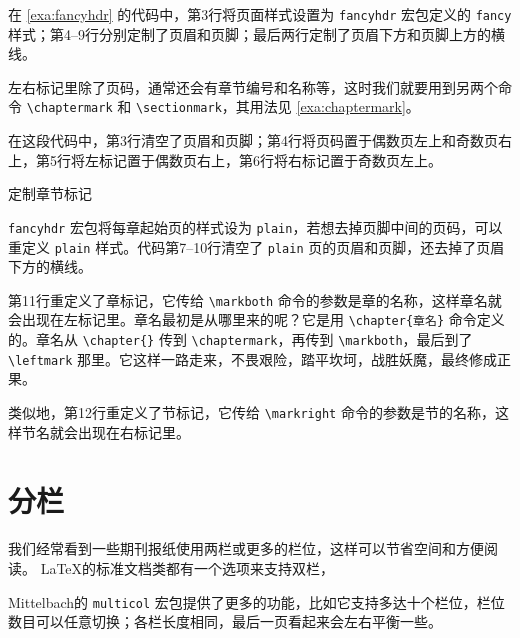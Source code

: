 在 \autoref{exa:fancyhdr} 的代码中，第3行将页面样式设置为 \texttt{fancyhdr} 宏包定义的 \texttt{fancy} 样式；第4--9行分别定制了页眉和页脚；最后两行定制了页眉下方和页脚上方的横线。

左右标记里除了页码，通常还会有章节编号和名称等，这时我们就要用到另两个命令 \verb|\chaptermark| 和 \verb|\sectionmark|，其用法见 \autoref{exa:chaptermark}。

在这段代码中，第3行清空了页眉和页脚；第4行将页码置于偶数页左上和奇数页右上，第5行将左标记置于偶数页右上，第6行将右标记置于奇数页左上。

\begin{example}[htbp]
\caption{定制章节标记}
\label{exa:chaptermark}
\end{example}

\texttt{fancyhdr} 宏包将每章起始页的样式设为 \texttt{plain}，若想去掉页脚中间的页码，可以重定义 \texttt{plain} 样式。代码第7--10行清空了 \texttt{plain} 页的页眉和页脚，还去掉了页眉下方的横线。

第11行重定义了章标记，它传给 \verb|\markboth| 命令的参数是章的名称，这样章名就会出现在左标记里。章名最初是从哪里来的呢？它是用 \verb|\chapter{章名}| 命令定义的。章名从 \verb|\chapter{}| 传到 \verb|\chaptermark|，再传到 \verb|\markboth|，最后到了 \verb|\leftmark| 那里。它这样一路走来，不畏艰险，踏平坎坷，战胜妖魔，最终修成正果。

类似地，第12行重定义了节标记，它传给 \verb|\markright| 命令的参数是节的名称，这样节名就会出现在右标记里。

\section{分栏}

我们经常看到一些期刊报纸使用两栏或更多的栏位，这样可以节省空间和方便阅读。 \LaTeX 的标准文档类都有一个选项来支持双栏，


Mittelbach\indexMittelbach 的 \texttt{multicol} 宏包提供了更多的功能，比如它支持多达十个栏位，栏位数目可以任意切换；各栏长度相同，最后一页看起来会左右平衡一些。

